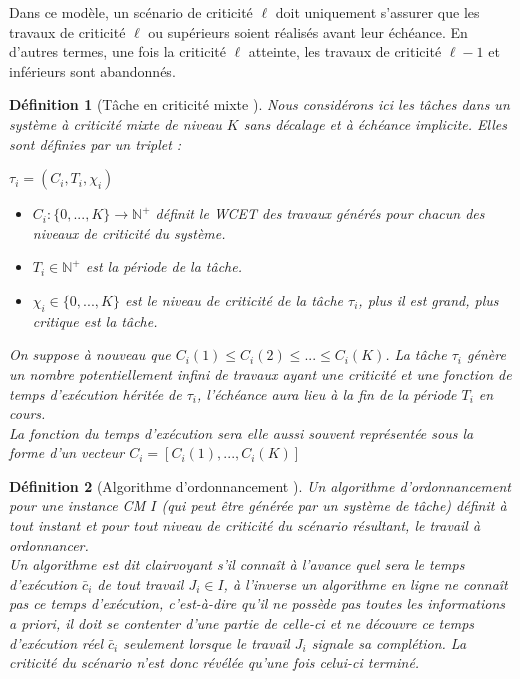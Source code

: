 \documentclass[12pt,a4paper,oneside]{book}
\theoremstyle{break}
\newtheorem{defin}{Définition}[chapter]
\theoremstyle{breakplain}
\begin{document}
Dans ce modèle, un scénario de criticité $\ell$ doit uniquement s'assurer que les travaux de criticité $\ell$ ou supérieurs soient réalisés avant leur échéance. En d'autres termes, une fois la criticité $\ell$ atteinte, les travaux de criticité $\ell-1$ et inférieurs sont abandonnés.

\begin{defin}[Tâche en criticité mixte \cite{BaruahBDMSS11}]
Nous considérons ici les tâches dans un système à criticité mixte de niveau $K$ sans décalage et à échéance implicite. Elles sont définies par un triplet :
\begin{center}
$\tau_i = (C_i, T_i, \chi_i)$\\
\end{center}
\begin{itemize}
\item $C_i : \{0, ..., K\} \rightarrow \mathbb{N}^{+}$ définit le WCET des travaux générés pour chacun des niveaux de criticité du système.
\item $T_i \in \mathbb{N}^{+}$ est la période de la tâche.
\item $\chi_i \in \{0, ..., K\}$ est le niveau de criticité de la tâche $\tau_i$, plus il est grand, plus critique est la tâche.\\
\end{itemize}

On suppose à nouveau que $C_i(1) \leq C_i(2) \leq ... \leq C_i(K)$. La tâche $\tau_i$ génère un nombre potentiellement infini de travaux ayant une criticité et une fonction de temps d'exécution héritée de $\tau_i$, l'échéance aura lieu à la fin de la période $T_i$ en cours.\\
La fonction du temps d'exécution sera elle aussi souvent représentée sous la forme d'un vecteur $C_i = [C_i(1), ..., C_i(K)]$
\end{defin}

\begin{defin}[Algorithme d'ordonnancement \cite{baruah2010towards}]
Un algorithme d'ordonnancement pour une instance CM $I$ (qui peut être générée par un système de tâche) définit à tout instant et pour tout niveau de criticité du scénario résultant, le travail à ordonnancer.\\

Un algorithme est dit clairvoyant s'il connaît à l'avance quel sera le temps d'exécution $\bar{c}_i$ de tout travail $J_i \in I$, à l'inverse un algorithme en ligne ne connaît pas ce temps d'exécution, c'est-à-dire qu'il ne possède pas toutes les informations \textit{a priori}, il doit se contenter d'une partie de celle-ci et ne découvre ce temps d'exécution réel $\bar{c}_i$ seulement lorsque le travail $J_i$ signale sa complétion. La criticité du scénario n'est donc révélée qu'une fois celui-ci terminé.
\end{defin}
\end{document}
